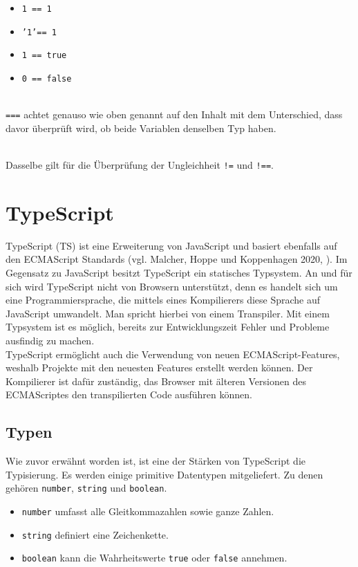 \begin{itemize}
	\item \texttt{1 == 1}
	\item \texttt{'1'== 1}
	\item \texttt{1 == true}
	\item \texttt{0 == false}
\end{itemize}

\mbox{}\\
\texttt{===} achtet genauso wie oben genannt auf den Inhalt mit dem Unterschied, dass davor überprüft wird, ob beide Variablen denselben Typ haben.

\mbox{}\\
Dasselbe gilt für die Überprüfung der Ungleichheit \texttt{!=} und \texttt{!==}.

\section{TypeScript}
TypeScript (TS) ist eine Erweiterung von JavaScript und basiert ebenfalls auf den ECMAScript Standards (vgl. Malcher, Hoppe und Koppenhagen 2020, \cite{typescript_2020}). Im Gegensatz zu JavaScript besitzt TypeScript ein statisches Typsystem. An und für sich wird TypeScript nicht von Browsern unterstützt, denn es handelt sich um eine Programmiersprache, die mittels eines Kompilierers diese Sprache auf JavaScript umwandelt. Man spricht hierbei von einem Transpiler. Mit einem Typsystem ist es möglich, bereits zur Entwicklungszeit Fehler und Probleme ausfindig zu machen.\\
TypeScript ermöglicht auch die Verwendung von neuen ECMAScript-Features, weshalb Projekte mit den neuesten Features erstellt werden können. Der Kompilierer ist dafür zuständig, das Browser mit älteren Versionen des ECMAScriptes den transpilierten Code ausführen können.

\newpage
\subsection{Typen}
Wie zuvor erwähnt worden ist, ist eine der Stärken von TypeScript die Typisierung. Es werden einige primitive Datentypen mitgeliefert. Zu denen gehören \texttt{number}, \texttt{string} und \texttt{boolean}.

\begin{itemize}
	\item \texttt{number} umfasst alle Gleitkommazahlen sowie ganze Zahlen.
	\item \texttt{string} definiert eine Zeichenkette.
	\item \texttt{boolean} kann die Wahrheitswerte \texttt{true} oder \texttt{false} annehmen.
\end{itemize}

